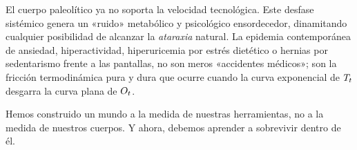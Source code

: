 El cuerpo paleolítico ya no soporta la velocidad tecnológica. Este desfase sistémico genera un «ruido» metabólico y psicológico ensordecedor, dinamitando cualquier posibilidad de alcanzar la \textit{ataraxia} natural. La epidemia contemporánea de ansiedad, hiperactividad, hiperuricemia por estrés dietético o hernias por sedentarismo frente a las pantallas, no son meros «accidentes médicos»; son la fricción termodinámica pura y dura que ocurre cuando la curva exponencial de $T_{t}$ desgarra la curva plana de $O_{t}$.

Hemos construido un mundo a la medida de nuestras herramientas, no a la medida de nuestros cuerpos. Y ahora, debemos aprender a sobrevivir dentro de él.